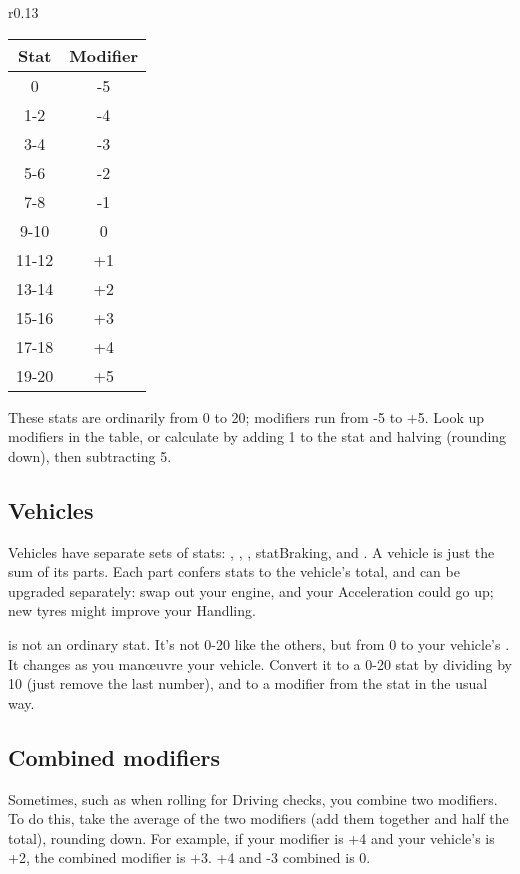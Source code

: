 \documentclass[10pt, a4paper, twocolumn]{article}
\begin{document}
\begin{wraptable}[12]{r}{0.13\textwidth}
\vspace*{-3ex}
\hspace*{-3ex}
\begin{tabular}{cc}
  Stat  & Modifier \\
  \hline 
  0     & -5       \\
  1-2   & -4       \\
  3-4   & -3       \\
  5-6   & -2       \\
  7-8   & -1       \\
  9-10  &  0       \\
  11-12 & +1       \\
  13-14 & +2       \\
  15-16 & +3       \\
  17-18 & +4       \\
  19-20 & +5
\end{tabular}
\end{wraptable}

These stats are ordinarily from 0 to 20; modifiers run from -5 to +5. Look up
modifiers in the table, or calculate by adding 1 to the stat and halving
(rounding down), then subtracting 5.

\subsection{Vehicles}
Vehicles have separate sets of stats: , ,
, stat{Braking},  and . A vehicle
is just the sum of its parts. Each part confers stats to the vehicle's total,
and can be upgraded separately: swap out your engine, and your Acceleration
could go up; new tyres might improve your Handling. 

 is not an ordinary stat. It's not 0-20 like the others, but from 0
to your vehicle's . It changes as you man\oe{}uvre your
vehicle. Convert it to a 0-20 stat by dividing by 10 (just remove the last
number), and to a modifier from the stat in the usual way.

\subsection{Combined modifiers}
Sometimes, such as when rolling for Driving checks, you combine two
modifiers. To do this, take the average of the two modifiers (add them
together and half the total), rounding down. For example, if your 
modifier is +4 and your vehicle's  is +2, the combined modifier
is +3. +4 and -3 combined is 0.
\end{document}

